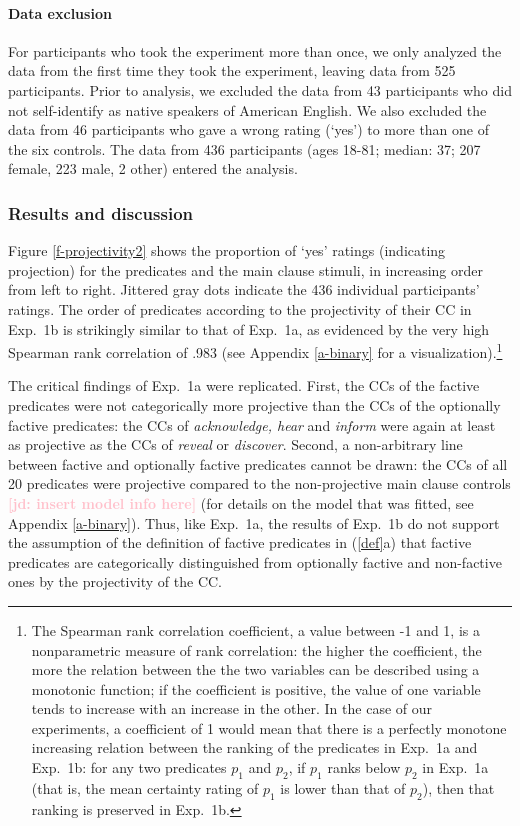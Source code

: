 \documentclass[11pt,fleqn]{article}
\newcommand{\jd}[1]{\textbf{\textcolor{Pink}{[jd: #1]}}}
\newcommand{\6}{\mbox{$[\hspace*{-.6mm}[$}}
\newcommand{\9}{\mbox{$]\hspace*{-.6mm}]$}}
\begin{document}
\paragraph{Data exclusion} For participants who took the experiment more than once, we only analyzed the data from the first time they took the experiment, leaving data from 525 participants. Prior to analysis, we excluded the data from 43 participants who did not self-identify as native speakers of American English. We also excluded the data from 46 participants who gave a wrong rating (`yes') to more than one of the six controls. The data from 436 participants (ages 18-81; median: 37; 207 female, 223 male, 2 other) entered the analysis. 

\subsubsection{Results and discussion}

Figure \ref{f-projectivity2} shows the proportion of `yes' ratings (indicating projection) for the predicates and the main clause stimuli, in increasing order from left to right. Jittered gray dots indicate the 436 individual participants' ratings. The order of predicates according to the projectivity of their CC in Exp.~1b is strikingly similar to that of Exp.~1a, as evidenced by the very high Spearman rank correlation of .983 (see Appendix \ref{a-binary} for a visualization).\footnote{The Spearman rank correlation coefficient, a value between -1 and 1, is a nonparametric measure of rank correlation: the higher the coefficient, the more the relation between the the two variables can be described using a monotonic function; if the coefficient is positive, the value of one variable tends to increase with an increase in the other. In the case of our experiments, a coefficient of 1 would mean that there is a perfectly monotone increasing relation between the ranking of the predicates in Exp.~1a and Exp.~1b: for any two predicates $p_1$ and $p_2$, if $p_1$ ranks below $p_2$ in Exp.~1a (that is, the mean certainty rating of $p_1$ is lower than that of $p_2$), then that ranking is preserved in Exp.~1b.} 

The critical findings of Exp.~1a were replicated. First, the CCs of the factive predicates were not categorically more projective than the CCs of the optionally factive predicates:  the CCs of {\em acknowledge, hear} and {\em inform} were again at least as projective as the CCs of {\em reveal} or {\em discover}. Second, a non-arbitrary line between factive and optionally factive predicates cannot be drawn: the CCs of all 20 predicates were projective compared to the non-projective main clause controls \jd{insert model info here} (for details on the model that was fitted, see Appendix \ref{a-binary}). Thus, like Exp.~1a, the results of Exp.~1b do not support the assumption of the definition of factive predicates in (\ref{def}a) that factive predicates are categorically distinguished from optionally factive and non-factive ones by the projectivity of the CC.
\end{document}
